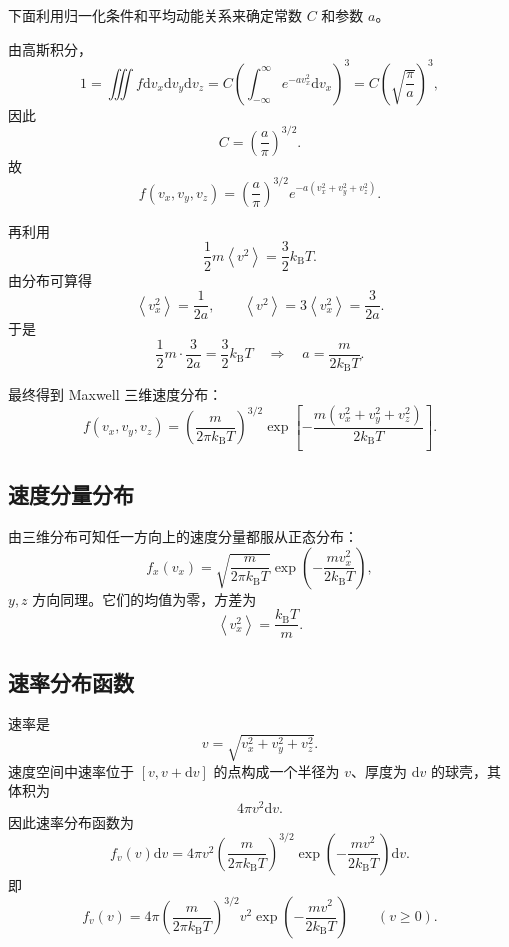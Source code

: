 \documentclass[11pt,a4paper,openany]{ctexbook}
\newcommand{\dd}{\mathrm d}
\newcommand{\kb}{k_{\mathrm B}}
\newcommand{\avg}[1]{\left\langle #1\right\rangle}
\begin{document}
下面利用归一化条件和平均动能关系来确定常数 $C$ 和参数 $a$。

由高斯积分，
\[
1=\iiint f\dd v_x\dd v_y\dd v_z
=
C\left(\int_{-\infty}^{\infty}e^{-av_x^2}\dd v_x\right)^3
=
C\left(\sqrt{\frac{\pi}{a}}\right)^3,
\]
因此
\[
C=\left(\frac{a}{\pi}\right)^{3/2}.
\]
故
\[
f(v_x,v_y,v_z)=\left(\frac{a}{\pi}\right)^{3/2}
e^{-a(v_x^2+v_y^2+v_z^2)}.
\]

再利用
\[
\frac12m\avg{v^2}=\frac32\kb T.
\]
由分布可算得
\[
\avg{v_x^2}=\frac{1}{2a},
\qquad
\avg{v^2}=3\avg{v_x^2}=\frac{3}{2a}.
\]
于是
\[
\frac12m\cdot\frac{3}{2a}=\frac32\kb T
\quad\Longrightarrow\quad
a=\frac{m}{2\kb T}.
\]

最终得到 Maxwell 三维速度分布：
\[
\boxed{
f(v_x,v_y,v_z)=
\left(\frac{m}{2\pi\kb T}\right)^{3/2}
\exp\!\left[-\frac{m(v_x^2+v_y^2+v_z^2)}{2\kb T}\right]
}.
\]

\subsection*{速度分量分布}
由三维分布可知任一方向上的速度分量都服从正态分布：
\[
f_x(v_x)=
\sqrt{\frac{m}{2\pi\kb T}}
\exp\!\left(-\frac{mv_x^2}{2\kb T}\right),
\]
$y,z$ 方向同理。它们的均值为零，方差为
\[
\avg{v_x^2}=\frac{\kb T}{m}.
\]

\subsection*{速率分布函数}
速率是
\[
v=\sqrt{v_x^2+v_y^2+v_z^2}.
\]
速度空间中速率位于 $[v,v+\dd v]$ 的点构成一个半径为 $v$、厚度为 $\dd v$ 的球壳，其体积为
\[
4\pi v^2\dd v.
\]
因此速率分布函数为
\[
f_v(v)\dd v
=
4\pi v^2
\left(\frac{m}{2\pi\kb T}\right)^{3/2}
\exp\left(-\frac{mv^2}{2\kb T}\right)\dd v.
\]
即
\[
\boxed{
f_v(v)=4\pi
\left(\frac{m}{2\pi\kb T}\right)^{3/2}
v^2
\exp\left(-\frac{mv^2}{2\kb T}\right)
}\qquad (v\ge0).
\]

\begin{center}
\end{center}
\end{document}
